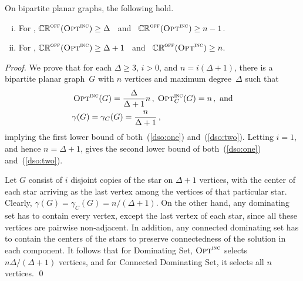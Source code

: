 \begin{proposition}
\label{prop:ds-onopt}
On bipartite planar graphs, the following hold.
\begin{enumerate}[(i)]
\item \label{dso:one} For \ds,
$\mathbb{CR}^{\textsc{off}}(\operatorname{\textsc{Opt}}^\textsc{\ensuremath{\text{inc}}}) \ge \Delta$ \, and \, 
$\mathbb{CR}^{\textsc{off}}(\operatorname{\textsc{Opt}}^\textsc{\ensuremath{\text{inc}}}) \ge n-1$.
\item \label{dso:two} For \cds,
$\mathbb{CR}^{\textsc{off}}(\operatorname{\textsc{Opt}}^\textsc{\ensuremath{\text{inc}}}) \ge \Delta+1$ \, and \, 
$\mathbb{CR}^{\textsc{off}}(\operatorname{\textsc{Opt}}^\textsc{\ensuremath{\text{inc}}}) \ge n$.
\end{enumerate}
\end{proposition}
\begin{proof}
We prove that for each $\Delta \ge 3$, $i > 0$, and $n=i(\Delta+1)$, there is a
bipartite planar graph~$G$ with $n$ vertices and maximum
degree~$\Delta$ such that 
\begin{align*}
&\operatorname{\textsc{Opt}}^\textsc{\ensuremath{\text{inc}}}(G) = \frac{\Delta}{\Delta+1}n\,,\;
 \operatorname{\textsc{Opt}}^\textsc{\ensuremath{\text{inc}}}_C(G) = n\,, \text{ and}\\
&\gamma(G) = \gamma_C(G) = \frac{n}{\Delta+1}\,,
\end{align*}
implying the first lower bound of both~(\ref{dso:one}) and~(\ref{dso:two}).
Letting $i=1$, and hence $n=\Delta+1$, gives the second lower bound of
both~(\ref{dso:one}) and~(\ref{dso:two}).

Let $G$ consist of $i$ disjoint copies of the star on $\Delta +1$ vertices,
with the center of each star arriving as the last vertex among
the vertices of that particular star.
Clearly, $\gamma(G) = \gamma_C(G) = n/(\Delta+1)$.
On the other hand, any \incr dominating set has to contain
every vertex, except the last vertex of each star, since all
these vertices are pairwise non-adjacent. 
In addition, any \incr connected dominating set
has to contain the centers of the stars
to preserve connectedness of the solution in each component.
It follows that for Dominating Set,
$\operatorname{\textsc{Opt}}^\textsc{\ensuremath{\text{inc}}}$ selects $n\Delta/(\Delta + 1)$ vertices, and for Connected
Dominating Set, it selects all $n$ vertices. 
\qed\end{proof}


